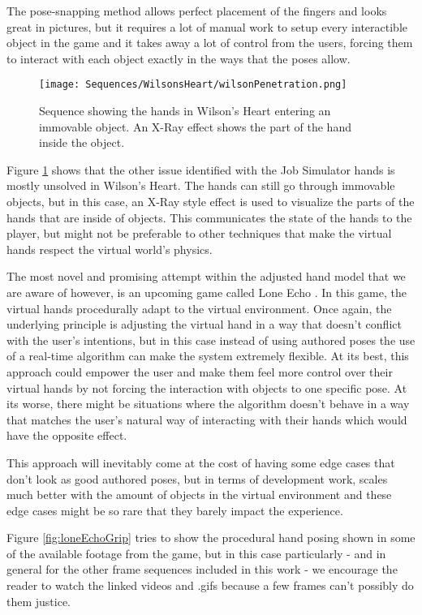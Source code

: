 The pose-snapping method allows perfect placement of the fingers and looks great in pictures, but it requires a lot of manual work to setup every interactible object in the game and it takes away a lot of control from the users, forcing them to interact with each object exactly in the ways that the poses allow.

\begin{figure}[H]
\centering
\texttt{[image: Sequences/WilsonsHeart/wilsonPenetration.png]}
\caption{Sequence showing the hands in Wilson's Heart entering an immovable object. An X-Ray effect shows the part of the hand inside the object.}
\label{fig:wilsonPenetration}
\end{figure}

Figure \ref{fig:wilsonPenetration} shows that the other issue identified with the Job Simulator hands is mostly unsolved in Wilson's Heart. The hands can still go through immovable objects, but in this case, an X-Ray style effect is used to visualize the parts of the hands that are inside of objects. This communicates the state of the hands to the player, but might not be preferable to other techniques that make the virtual hands respect the virtual world's physics.

The most novel and promising attempt within the adjusted hand model that we are aware of however, is an upcoming game called Lone Echo \parencite{ReadyAtDawn}. In this game, the virtual hands procedurally adapt to the virtual environment. Once again, the underlying principle is adjusting the virtual hand in a way that doesn't conflict with the user's intentions, but in this case instead of using authored poses the use of a real-time algorithm can make the system extremely flexible. At its best, this approach could empower the user and make them feel more control over their virtual hands by not forcing the interaction with objects to one specific pose. At its worse, there might be situations where the algorithm doesn't behave in a way that matches the user's natural way of interacting with their hands which would have the opposite effect.

This approach will inevitably come at the cost of having some edge cases that don't look as good authored poses, but in terms of development work, scales much better with the amount of objects in the virtual environment and these edge cases might be so rare that they barely impact the experience.

Figure \ref{fig:loneEchoGrip} tries to show the procedural hand posing shown in some of the available footage from the game, but in this case particularly - and in general for the other frame sequences included in this work - we encourage the reader to watch the linked videos and .gifs because a few frames can't possibly do them justice.


